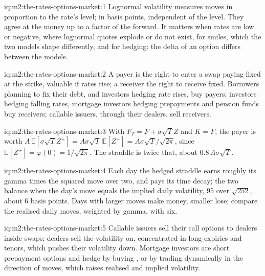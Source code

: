 \begin{solution}{iq:m2:the-rates-options-market:1}
Lognormal volatility measures moves in proportion to the rate's level;  in basis points, independent of the level. They agree at the money
up to a factor of the forward. It matters when rates are low or negative,
where lognormal quotes explode or do not exist, for smiles, which the two
models shape differently, and for hedging: the delta of an option differs
between the models.
\end{solution}

\begin{solution}{iq:m2:the-rates-options-market:2}
A payer is the right to enter a swap paying fixed at the strike, valuable if
rates rise; a receiver the right to receive fixed. Borrowers planning to fix
their debt, and investors hedging rate rises, buy payers; investors hedging
falling rates, mortgage investors hedging prepayments and pension funds buy
receivers; callable issuers, through their dealers, sell receivers.
\end{solution}

\begin{solution}{iq:m2:the-rates-options-market:3}
With $F_T = F + \sigma\sqrt T Z$ and $K = F$, the payer is worth
$A\,\mathbb{E}[\sigma\sqrt T Z^+] = A\sigma\sqrt T\,\mathbb{E}[Z^+] =
A\sigma\sqrt T/\sqrt{2\pi}$, since $\mathbb{E}[Z^+] = \varphi(0) = 1/\sqrt{2\pi}$.
The straddle is twice that, about $0.8\,A\sigma\sqrt T$.
\end{solution}

\begin{solution}{iq:m2:the-rates-options-market:4}
Each day the hedged straddle earns roughly its gamma times the squared move
over two, and pays its time decay; the two balance when the day's move equals
the implied daily volatility, 95 over $\sqrt{252}$, about 6 basis points. Days
with larger moves make money, smaller lose; compare the realised daily moves,
weighted by gamma, with six.
\end{solution}

\begin{solution}{iq:m2:the-rates-options-market:5}
Callable issuers sell their call options to dealers inside swaps; dealers sell
the volatility on, concentrated in long expiries and tenors, which pushes
their volatility down. Mortgage investors are short prepayment options and hedge
by buying , or by trading dynamically in the direction of moves, which
raises realised and implied volatility.
\end{solution}

